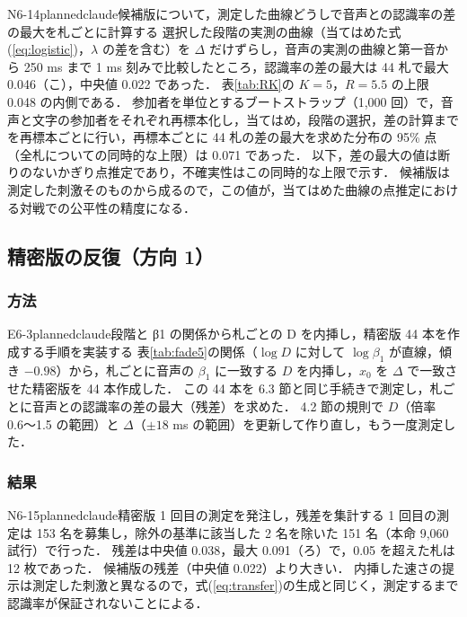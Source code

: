\begin{fd}{N6-14}{planned}{claude}{候補版について，測定した曲線どうしで音声との認識率の差の最大を札ごとに計算する}
選択した段階の実測の曲線（当てはめた式(\ref{eq:logistic})，$\lambda$ の差を含む）を $\Delta$ だけずらし，音声の実測の曲線と第一音から 250 ms まで 1 ms 刻みで比較したところ，認識率の差の最大は 44 札で最大 0.046（こ），中央値 0.022 であった．
表\ref{tab:RK}の $K = 5$，$R = 5.5$ の上限 0.048 の内側である．
参加者を単位とするブートストラップ（1,000 回）で，音声と文字の参加者をそれぞれ再標本化し，当てはめ，段階の選択，差の計算までを再標本ごとに行い，再標本ごとに 44 札の差の最大を求めた分布の 95\% 点（全札についての同時的な上限）は 0.071 であった．
以下，差の最大の値は断りのないかぎり点推定であり，不確実性はこの同時的な上限で示す．
候補版は測定した刺激そのものから成るので，この値が，当てはめた曲線の点推定における対戦での公平性の精度になる．
\end{fd}

\subsection{精密版の反復（方向 1）}

\subsubsection{方法}
\begin{fd}{E6-3}{planned}{claude}{段階と β1 の関係から札ごとの D を内挿し，精密版 44 本を作成する手順を実装する}
表\ref{tab:fade5}の関係（$\log D$ に対して $\log \beta_1$ が直線，傾き $-0.98$）から，札ごとに音声の $\beta_1$ に一致する $D$ を内挿し，$x_0$ を $\Delta$ で一致させた精密版を 44 本作成した．
この 44 本を 6.3 節と同じ手続きで測定し，札ごとに音声との認識率の差の最大（残差）を求めた．
4.2 節の規則で $D$（倍率 0.6〜1.5 の範囲）と $\Delta$（$\pm 18$ ms の範囲）を更新して作り直し，もう一度測定した．
\end{fd}

\subsubsection{結果}
\begin{fd}{N6-15}{planned}{claude}{精密版 1 回目の測定を発注し，残差を集計する}
1 回目の測定は 153 名を募集し，除外の基準に該当した 2 名を除いた 151 名（本命 9,060 試行）で行った．
残差は中央値 0.038，最大 0.091（ろ）で，0.05 を超えた札は 12 枚であった．
候補版の残差（中央値 0.022）より大きい．
内挿した速さの提示は測定した刺激と異なるので，式(\ref{eq:transfer})の生成と同じく，測定するまで認識率が保証されないことによる．
\end{fd}

